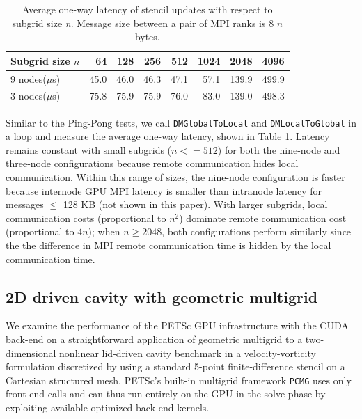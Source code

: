 \documentclass[5p,times]{elsarticle}
\begin{document}
\begin{table}[ht]
\small
\setlength\tabcolsep{4.5pt}
\caption{Average one-way latency of stencil updates with respect to subgrid size \textit{n}. Message 
size 
between a pair of MPI ranks is 
8 $n$ bytes.}
\begin{tabular}{|l|r|r|r|r|r|r|r|}
\hline
Subgrid size $n$       & 64   & 128  & 256  & 512  & 1024 & 2048  & 4096 \\ \hline
9  nodes($\mu$s)    & 45.0 & 46.0 & 46.3 & 47.1 & 57.1 & 139.9 & 499.9 \\ \hline
3  nodes($\mu$s)    & 75.8 & 75.9 & 75.9 & 76.0 & 83.0 & 139.0 & 498.3 \\ \hline
\end{tabular}
\label{tab:sfdmda}
\end{table}

Similar to the Ping-Pong tests, we call
\texttt{DMGlobalToLocal} and \texttt{DMLocalToGlobal} in a loop and measure the
average one-way latency, shown in Table \ref{tab:sfdmda}.
Latency remains constant with
small subgrids ($n<=512$) for both the nine-node and three-node configurations
because remote communication hides local communication.
Within this range of sizes, the nine-node configuration is faster because
internode GPU MPI latency is smaller than intranode latency for messages $\leq$ 128 KB
(not shown in this paper). With larger subgrids, local communication
costs (proportional to $n^2$) dominate remote
communication cost (proportional to $4n$); when 
$n \ge 2048$, both configurations perform similarly since the
the difference in MPI remote communication time is hidden by the local
communication time.



\subsection{2D driven cavity with geometric multigrid}
\label{subsec:multigrid}

We examine the performance of the PETSc GPU infrastructure
with the CUDA back-end
on a straightforward application of geometric multigrid to a
two-dimensional nonlinear lid-driven cavity benchmark in a velocity-vorticity formulation discretized by using a standard 5-point finite-difference stencil on a Cartesian structured mesh.
PETSc's built-in multigrid framework {\tt PCMG} uses only front-end calls and can thus run entirely on the GPU
in the solve phase by exploiting available optimized back-end kernels.
\end{document}
